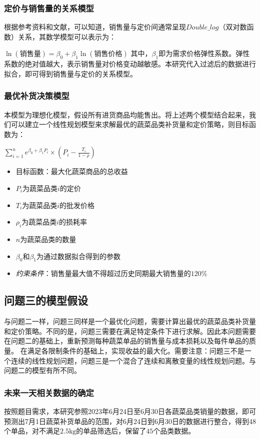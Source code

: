 \documentclass{article}
\begin{document}
\subsubsection{定价与销售量的关系模型}
根据参考资料和文献，可以知道，销售量与定价间通常呈现$Double\_log$（双对数函数）关系，其数学模型可以表示为：

$\ln(\text{销售量}) = \beta_0 + \beta_1 \ln(\text{销售价格})$
其中，$\beta_1$即为需求价格弹性系数。弹性系数的绝对值越大，表示销售量对价格变动越敏感。本研究代入过滤后的数据进行拟合，即可得到销售量与定价的关系模型。

\subsubsection{最优补货决策模型}
本模型为理想化模型，假设所有进货商品均能售出。将上述两个模型结合起来，我们可以建立一个线性规划模型来求解最优的蔬菜品类补货量和定价策略，则目标函数为：

$ \sum_{i=1}^{n}e^{\beta_0 + \beta_1P_i} \times (P_i -\frac{T_i}{1-\rho})$
\begin{itemize}
    \item 目标函数：最大化蔬菜商品的总收益
    \item $P_i$为蔬菜品类$i$的定价
    \item $T_i$为蔬菜品类$i$的批发价格
    \item $\rho_i$为蔬菜品类$i$的损耗率
    \item $n$为蔬菜品类的数量
    \item $\beta_0$和$\beta_1$为通过数据拟合得到的参数
    \item \textit{约束条件}：销售量最大值不得超过历史同期最大销售量的$120\%$
\end{itemize}

\subsection{问题三的模型假设}
与问题二一样，问题三同样是一个最优化问题，需要计算出最优的蔬菜品类补货量和定价策略。不同的是，问题三需要在满足特定条件下进行求解。因此本问题需要在问题二的基础上，重新预测每种蔬菜单品的销售量与成本损耗以及每件单品的质量。
在满足各限制条件的基础上，实现收益的最大化。需要注意：问题三不是一个连续的线性规划问题，问题三是一个混合了连续和离散变量的线性规划问题。与问题二的模型有所不同。

\subsubsection{未来一天相关数据的确定}
按照题目需求，本研究参照2023年6月24日至6月30日各蔬菜品类销量的数据，即可预测出7月1日蔬菜补货单品的范围，对6月24日到6月30日的数据进行整合，得到48个单品，对不满足$2.5 \text{kg}$的单品筛选后，保留了$45$个品类数据。
\end{document}
